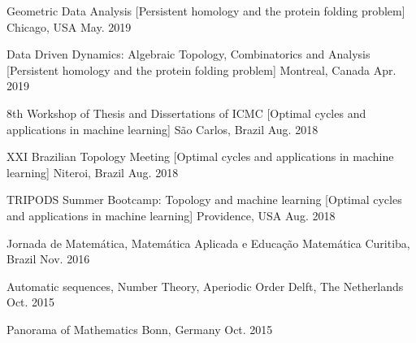 
\begin{cvhonors}

\cvhonor
  {Geometric Data Analysis} %
  [Persistent homology and the protein folding problem] %
  {Chicago, USA} %
  {May. 2019} %

\cvhonor
  {Data Driven Dynamics: Algebraic Topology, Combinatorics and Analysis} %
  [Persistent homology and the protein folding problem] %
  {Montreal, Canada} %
  {Apr. 2019} %

\cvhonor
  {8th Workshop of Thesis and Dissertations of ICMC} %
  [Optimal cycles and applications in machine learning] %
  {São Carlos, Brazil} %
  {Aug. 2018} %

\cvhonor
  {XXI Brazilian Topology Meeting} %
  [Optimal cycles and applications in machine learning] %
  {Niteroi, Brazil} %
  {Aug. 2018} %

\cvhonor
  {TRIPODS Summer Bootcamp: Topology and machine learning} %
  [Optimal cycles and applications in machine learning] %
  {Providence, USA} %
  {Aug. 2018} %

\cvhonor
  {Jornada de Matemática, Matemática Aplicada e Educação Matemática} %
  {Curitiba, Brazil} %
  {Nov. 2016} %

\cvhonor
  {Automatic sequences, Number Theory, Aperiodic Order} %
  {Delft, The Netherlands} %
  {Oct. 2015} %

\cvhonor
  {Panorama of Mathematics} %
  {Bonn, Germany} %
  {Oct. 2015} %

\end{cvhonors}
